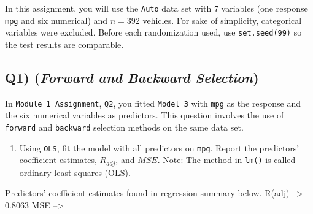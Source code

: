 \documentclass[
]{article}
\providecommand{\tightlist}{%
  \setlength{\itemsep}{0pt}\setlength{\parskip}{0pt}}
\begin{document}
In this assignment, you will use the \texttt{Auto} data set with \(7\)
variables (one response \texttt{mpg} and six numerical) and \(n=392\)
vehicles. For sake of simplicity, categorical variables were excluded.
Before each randomization used, use \texttt{set.seed(99)} so the test
results are comparable.

\hypertarget{q1-forward-and-backward-selection}{%
\subsection{\texorpdfstring{Q1) (\emph{Forward and Backward
Selection})}{Q1) (Forward and Backward Selection)}}\label{q1-forward-and-backward-selection}}

In \texttt{Module\ 1\ Assignment}, \texttt{Q2}, you fitted
\texttt{Model\ 3} with \texttt{mpg} as the response and the six
numerical variables as predictors. This question involves the use of
\texttt{forward} and \texttt{backward} selection methods on the same
data set.

\begin{enumerate}
\def\labelenumi{\alph{enumi}.}
\tightlist
\item
  Using \texttt{OLS}, fit the model with all predictors on \texttt{mpg}.
  Report the predictors' coefficient estimates, \(R_{adj}\), and
  \(MSE\). Note: The method in \texttt{lm()} is called ordinary least
  squares (OLS).
\end{enumerate}

Predictors' coefficient estimates found in regression summary below.
R(adj) --\textgreater{} 0.8063 MSE --\textgreater{}
\end{document}
